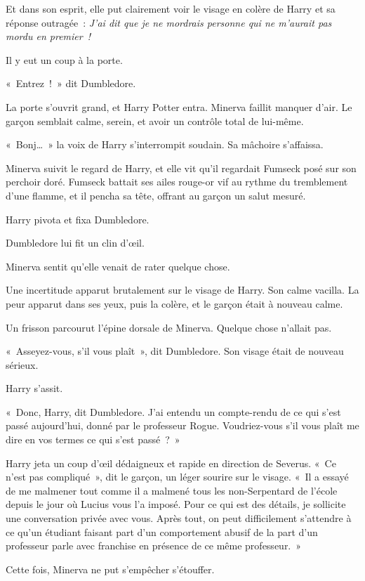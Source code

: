 Et dans son esprit, elle put clairement voir le visage en colère de Harry et sa réponse outragée~: \emph{J'ai dit que je ne mordrais personne qui ne m'aurait pas mordu en premier~!}

Il y eut un coup à la porte.

«~Entrez~!~» dit Dumbledore.

La porte s'ouvrit grand, et Harry Potter entra. Minerva faillit manquer d'air. Le garçon semblait calme, serein, et avoir un contrôle total de lui-même.

«~Bonj…~» la voix de Harry s'interrompit soudain. Sa mâchoire s'affaissa.

Minerva suivit le regard de Harry, et elle vit qu'il regardait Fumseck posé sur son perchoir doré. Fumseck battait ses ailes rouge-or vif au rythme du tremblement d'une flamme, et il pencha sa tête, offrant au garçon un salut mesuré.

Harry pivota et fixa Dumbledore.

Dumbledore lui fit un clin d'œil.

Minerva sentit qu'elle venait de rater quelque chose.

Une incertitude apparut brutalement sur le visage de Harry. Son calme vacilla. La peur apparut dans ses yeux, puis la colère, et le garçon était à nouveau calme.

Un frisson parcourut l'épine dorsale de Minerva. Quelque chose n'allait pas.

«~Asseyez-vous, s'il vous plaît~», dit Dumbledore. Son visage était de nouveau sérieux.

Harry s'assit.

«~Donc, Harry, dit Dumbledore. J'ai entendu un compte-rendu de ce qui s'est passé aujourd'hui, donné par le professeur Rogue. Voudriez-vous s'il vous plaît me dire en vos termes ce qui s'est passé~?~»

Harry jeta un coup d'œil dédaigneux et rapide en direction de Severus. «~Ce n'est pas compliqué~», dit le garçon, un léger sourire sur le visage. «~Il a essayé de me malmener tout comme il a malmené tous les non-Serpentard de l'école depuis le jour où Lucius vous l'a imposé. Pour ce qui est des détails, je sollicite une conversation privée avec vous. Après tout, on peut difficilement s'attendre à ce qu'un étudiant faisant part d'un comportement abusif de la part d'un professeur parle avec franchise en présence de ce même professeur.~»

Cette fois, Minerva ne put s'empêcher s'étouffer.

